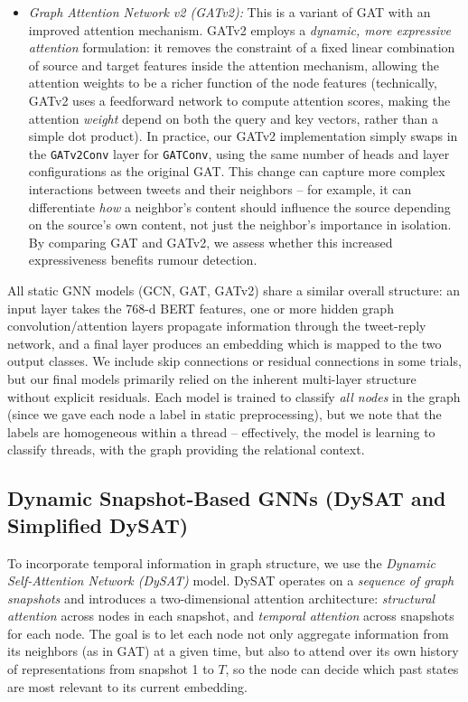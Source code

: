 \documentclass{cshonours}
\begin{document}
\begin{itemize}
\item \emph{Graph Attention Network v2 (GATv2):} This is a variant of GAT with an improved attention mechanism. GATv2 employs a \emph{dynamic, more expressive attention} formulation: it removes the constraint of a fixed linear combination of source and target features inside the attention mechanism, allowing the attention weights to be a richer function of the node features (technically, GATv2 uses a feedforward network to compute attention scores, making the attention \emph{weight} depend on both the query and key vectors, rather than a simple dot product). In practice, our GATv2 implementation simply swaps in the \texttt{GATv2Conv} layer for \texttt{GATConv}, using the same number of heads and layer configurations as the original GAT. This change can capture more complex interactions between tweets and their neighbors – for example, it can differentiate \emph{how} a neighbor's content should influence the source depending on the source's own content, not just the neighbor's importance in isolation. By comparing GAT and GATv2, we assess whether this increased expressiveness benefits rumour detection.
\end{itemize}

All static GNN models (GCN, GAT, GATv2) share a similar overall structure: an input layer takes the 768-d BERT features, one or more hidden graph convolution/attention layers propagate information through the tweet-reply network, and a final layer produces an embedding which is mapped to the two output classes. We include skip connections or residual connections in some trials, but our final models primarily relied on the inherent multi-layer structure without explicit residuals. Each model is trained to classify \emph{all nodes} in the graph (since we gave each node a label in static preprocessing), but we note that the labels are homogeneous within a thread – effectively, the model is learning to classify threads, with the graph providing the relational context.

\subsection{Dynamic Snapshot-Based GNNs (DySAT and Simplified DySAT)}

To incorporate temporal information in graph structure, we use the \emph{Dynamic Self-Attention Network (DySAT)} model. DySAT operates on a \emph{sequence of graph snapshots} and introduces a two-dimensional attention architecture: \emph{structural attention} across nodes in each snapshot, and \emph{temporal attention} across snapshots for each node. The goal is to let each node not only aggregate information from its neighbors (as in GAT) at a given time, but also to attend over its own history of representations from snapshot 1 to $T$, so the node can decide which past states are most relevant to its current embedding.
\end{document}
